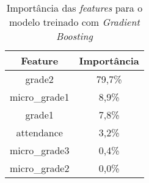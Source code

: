 \begin{table}[!htb]
    \centering
    \caption{Importância das \textit{features} para o modelo treinado com \textit{Gradient Boosting}}
    \begin{tabular}{@{}cc@{}}
        \hline
        \textbf{ Feature } & \textbf{ Importância } \\ \hline
        grade2  & 79,7\% \\
        micro\_grade1  & 8,9\% \\
        grade1  & 7,8\% \\
        attendance  & 3,2\% \\
        micro\_grade3  & 0,4\% \\
        micro\_grade2  & 0,0\% \\ \bottomrule
    \end{tabular}
    \label{tab:importanciaGradient}
\end{table}